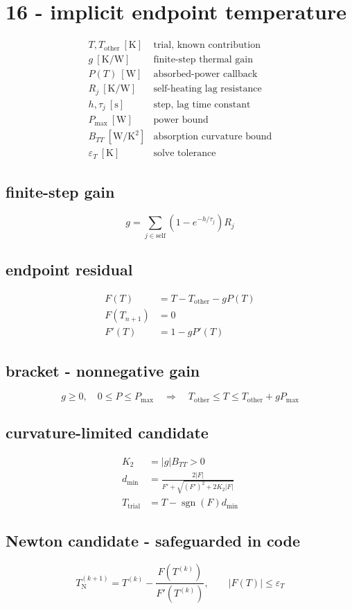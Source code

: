 \section*{16 - implicit endpoint temperature}

\[
\begin{array}{ll}T,T_{\mathrm{other}}\ [\mathrm K]&\text{trial, known contribution}\\[0.6em]g\ [\mathrm{K/W}]&\text{finite-step thermal gain}\\[0.6em]P(T)\ [\mathrm W]&\text{absorbed-power callback}\\[0.6em]R_j\ [\mathrm{K/W}]&\text{self-heating lag resistance}\\[0.6em]h,\tau_j\ [\mathrm s]&\text{step, lag time constant}\\[0.6em]P_{\max}\ [\mathrm W]&\text{power bound}\\[0.6em]B_{TT}\ [\mathrm{W/K^2}]&\text{absorption curvature bound}\\[0.6em]\varepsilon_T\ [\mathrm K]&\text{solve tolerance}\end{array}
\]

\subsection*{finite-step gain}
\[
\displaystyle g=\sum_{j\in\mathrm{self}}(1-e^{-h/\tau_j})R_j
\]

\subsection*{endpoint residual}
\[
\displaystyle \begin{aligned}F(T)&=T-T_{\mathrm{other}}-gP(T)\\F(T_{n+1})&=0\\F'(T)&=1-gP'(T)\end{aligned}
\]

\subsection*{bracket - nonnegative gain}
\[
\displaystyle g\ge0,\quad0\le P\le P_{\max}\quad\Rightarrow\quad T_{\mathrm{other}}\le T\le T_{\mathrm{other}}+gP_{\max}
\]

\subsection*{curvature-limited candidate}
\[
\displaystyle \begin{aligned}K_2&=|g|B_{TT}>0\\d_{\min}&=\frac{2|F|}{F'+\sqrt{(F')^2+2K_2|F|}}\\T_{\mathrm{trial}}&=T-\operatorname{sgn}(F)d_{\min}\end{aligned}
\]

\subsection*{Newton candidate - safeguarded in code}
\[
\displaystyle T^{(k+1)}_{\mathrm N}=T^{(k)}-\frac{F(T^{(k)})}{F'(T^{(k)})},\qquad |F(T)|\le\varepsilon_T
\]
